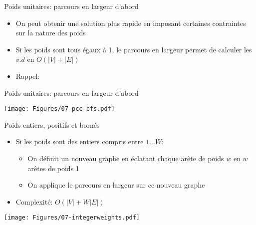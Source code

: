 
\begin{frame}{Poids unitaires: parcours en largeur d'abord}

\begin{itemize}
\item On peut obtenir une solution plus rapide en imposant certaines
  contraintes sur la nature des poids
\item Si les poids sont tous égaux à 1, le parcours en largeur permet
  de calculer les $v.d$ en $O(|V|+|E|)$
\item Rappel:
\end{itemize}

\begin{center}
{\small
{}
}
\end{center}

\end{frame}

\begin{frame}{Poids unitaires: parcours en largeur d'abord}

\centerline{\texttt{[image: Figures/07-pcc-bfs.pdf]}}

\end{frame}

\begin{frame}{Poids entiers, positifs et bornés}

\begin{itemize}
\item Si les poids sont des entiers compris entre $1\ldots W$:
\begin{itemize}
\item On définit un nouveau graphe en éclatant chaque arête de poids $w$ en $w$ arêtes de poids 1
\item On applique le parcours en largeur sur ce nouveau graphe
\end{itemize}
\item Complexité: $O(|V|+W |E|)$
\end{itemize}

\centerline{\texttt{[image: Figures/07-integerweights.pdf]}}

\end{frame}

